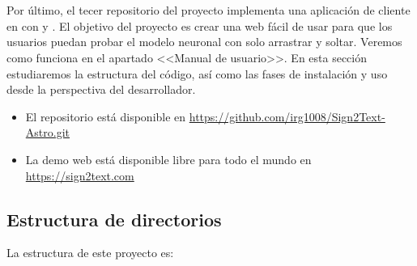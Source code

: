 

\section{}

Por último, el tecer repositorio del proyecto implementa una aplicación de cliente en  con   y  . El objetivo del proyecto es crear una web fácil de usar para que los usuarios puedan probar el modelo neuronal con solo arrastrar y soltar. Veremos como funciona en el apartado <<Manual de usuario>>. En esta sección estudiaremos la estructura del código, así como las fases de instalación y uso desde la perspectiva del desarrollador.

\begin{itemize}
  \item El repositorio está disponible en \url{https://github.com/irg1008/Sign2Text-Astro.git}
  \item La demo web está disponible libre para todo el mundo en \url{https://sign2text.com}
\end{itemize}

\subsection{Estructura de directorios}

La estructura de este proyecto es:

